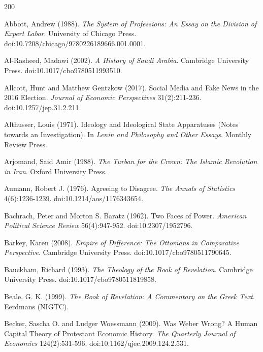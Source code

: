 \documentclass[11pt,letterpaper]{article}
\theoremstyle{definition}
\theoremstyle{remark}
\begin{document}
\begin{thebibliography}{200}
\small
\raggedright

Abbott, Andrew (1988). \emph{The System of Professions: An Essay on the Division of Expert Labor}. University of Chicago Press. doi:10.7208/chicago/9780226189666.001.0001.

Al-Rasheed, Madawi (2002). \emph{A History of Saudi Arabia}. Cambridge University Press. doi:10.1017/cbo9780511993510.

Allcott, Hunt and Matthew Gentzkow (2017). Social Media and Fake News in the 2016 Election. \emph{Journal of Economic Perspectives} 31(2):211-236. doi:10.1257/jep.31.2.211.

Althusser, Louis (1971). Ideology and Ideological State Apparatuses (Notes towards an Investigation). In \emph{Lenin and Philosophy and Other Essays}. Monthly Review Press.

Arjomand, Said Amir (1988). \emph{The Turban for the Crown: The Islamic Revolution in Iran}. Oxford University Press.

Aumann, Robert J. (1976). Agreeing to Disagree. \emph{The Annals of Statistics} 4(6):1236-1239. doi:10.1214/aos/1176343654.

Bachrach, Peter and Morton S. Baratz (1962). Two Faces of Power. \emph{American Political Science Review} 56(4):947-952. doi:10.2307/1952796.

Barkey, Karen (2008). \emph{Empire of Difference: The Ottomans in Comparative Perspective}. Cambridge University Press. doi:10.1017/cbo9780511790645.

Bauckham, Richard (1993). \emph{The Theology of the Book of Revelation}. Cambridge University Press. doi:10.1017/cbo9780511819858.

Beale, G. K. (1999). \emph{The Book of Revelation: A Commentary on the Greek Text}. Eerdmans (NIGTC).

Becker, Sascha O. and Ludger Woessmann (2009). Was Weber Wrong? A Human Capital Theory of Protestant Economic History. \emph{The Quarterly Journal of Economics} 124(2):531-596. doi:10.1162/qjec.2009.124.2.531.


\end{thebibliography}
\end{document}
